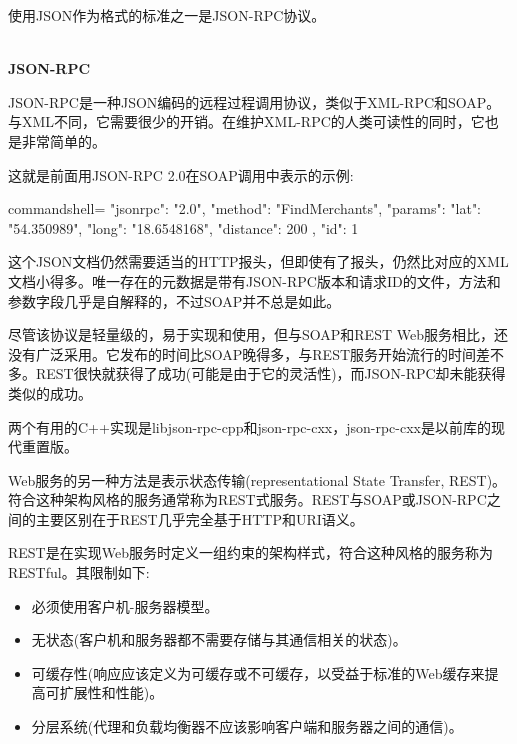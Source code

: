 使用JSON作为格式的标准之一是JSON-RPC协议。

\hspace*{\fill} \\ %
\noindent
\textbf{JSON-RPC}

JSON-RPC是一种JSON编码的远程过程调用协议，类似于XML-RPC和SOAP。与XML不同，它需要很少的开销。在维护XML-RPC的人类可读性的同时，它也是非常简单的。

这就是前面用JSON-RPC 2.0在SOAP调用中表示的示例:

\begin{tcblisting}{commandshell={}}
{
  "jsonrpc": "2.0",
  "method": "FindMerchants",
  "params": {
    "lat": "54.350989",
    "long": "18.6548168",
    "distance": 200
  },
  "id": 1
}
\end{tcblisting}

这个JSON文档仍然需要适当的HTTP报头，但即使有了报头，仍然比对应的XML文档小得多。唯一存在的元数据是带有JSON-RPC版本和请求ID的文件，方法和参数字段几乎是自解释的，不过SOAP并不总是如此。

尽管该协议是轻量级的，易于实现和使用，但与SOAP和REST Web服务相比，还没有广泛采用。它发布的时间比SOAP晚得多，与REST服务开始流行的时间差不多。REST很快就获得了成功(可能是由于它的灵活性)，而JSON-RPC却未能获得类似的成功。

两个有用的C++实现是libjson-rpc-cpp和json-rpc-cxx，json-rpc-cxx是以前库的现代重置版。


Web服务的另一种方法是表示状态传输(representational State Transfer, REST)。符合这种架构风格的服务通常称为REST式服务。REST与SOAP或JSON-RPC之间的主要区别在于REST几乎完全基于HTTP和URI语义。

REST是在实现Web服务时定义一组约束的架构样式，符合这种风格的服务称为RESTful。其限制如下:

\begin{itemize}
\item 
必须使用客户机-服务器模型。

\item 
无状态(客户机和服务器都不需要存储与其通信相关的状态)。

\item 
可缓存性(响应应该定义为可缓存或不可缓存，以受益于标准的Web缓存来提高可扩展性和性能)。

\item 
分层系统(代理和负载均衡器不应该影响客户端和服务器之间的通信)。
\end{itemize}

